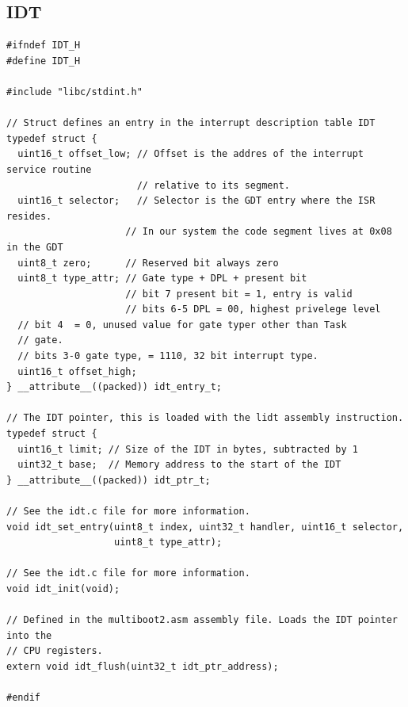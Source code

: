 \documentclass[../main.tex]{subfiles}
\begin{document}
\subsection{IDT}
\label{apx:idt}


\label{lst:idt_h}
\begin{verbatim}
#ifndef IDT_H
#define IDT_H

#include "libc/stdint.h"

// Struct defines an entry in the interrupt description table IDT
typedef struct {
  uint16_t offset_low; // Offset is the addres of the interrupt service routine
                       // relative to its segment.
  uint16_t selector;   // Selector is the GDT entry where the ISR resides.
                     // In our system the code segment lives at 0x08 in the GDT
  uint8_t zero;      // Reserved bit always zero
  uint8_t type_attr; // Gate type + DPL + present bit
                     // bit 7 present bit = 1, entry is valid
                     // bits 6-5 DPL = 00, highest privelege level
  // bit 4  = 0, unused value for gate typer other than Task
  // gate.
  // bits 3-0 gate type, = 1110, 32 bit interrupt type.
  uint16_t offset_high;
} __attribute__((packed)) idt_entry_t;

// The IDT pointer, this is loaded with the lidt assembly instruction.
typedef struct {
  uint16_t limit; // Size of the IDT in bytes, subtracted by 1
  uint32_t base;  // Memory address to the start of the IDT
} __attribute__((packed)) idt_ptr_t;

// See the idt.c file for more information.
void idt_set_entry(uint8_t index, uint32_t handler, uint16_t selector,
                   uint8_t type_attr);

// See the idt.c file for more information.
void idt_init(void);

// Defined in the multiboot2.asm assembly file. Loads the IDT pointer into the
// CPU registers.
extern void idt_flush(uint32_t idt_ptr_address);

#endif

\end{verbatim}
\end{document}

